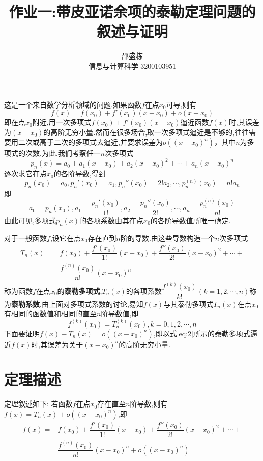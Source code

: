 \documentclass{ctexart}
\title{作业一:带皮亚诺余项的泰勒定理问题的叙述与证明}
\author{邵盛栋 \\ 信息与计算科学 3200103951}
\begin{document}
\maketitle


这是一个来自数学分析领域的问题,如果函数$ f $在点$ x_{0} $可导,则有
\[f(x)=f(x_{0})+f'(x_{0})(x-x_{0})+o(x-x_{0})\]
即在点$ x_{0} $附近,用一次多项式$ f(x_{0})+f'(x_{0})(x-x_{0}) $逼近函数$ f(x) $时,其误差为$ (x-x_{0}) $的高阶无穷小量.然而在很多场合,取一次多项式逼近是不够的,往往需要用二次或高于二次的多项式去逼近,并要求误差为$ o((x-x_{0})^{n}) $，其中$ n $为多项式的次数.为此,我们考察任一$ n $次多项式
\begin{equation}
	p_{n}(x)=a_{0}+a_{1}(x-x_{0})+a_{2}(x-x_{0})^{2}+\cdots+a_{n}(x-x_{0})^{n}
	\label{eq:1}
\end{equation}
逐次求它在点$ x_{0} $的各阶导数,得到
\[p_{n}(x_{0})=a_{0},p_{n}'(x_{0})=a_{1},p_{n}''(x_{0})=2!a_{2},\cdots,p_{n}^{(n)}(x_{0})=n!a_{n}\]
即
\[a_{0}=p_{n}(x_{0}),a_{1}=\dfrac{p_{n}'(x_{0})}{1!},a_{2}=\dfrac{p_{n}''(x_{0})}{2!},\cdots,a_{n}=\dfrac{p_{n}^{(n)}(x_{0})}{n!}\]
由此可见,多项式$ p_{n}(x) $的各项系数由其在点$ x_{0} $的各阶导数值所唯一确定.

对于一般函数$ f $,设它在点$ x_{0} $存在直到$ n $阶的导数.由这些导数构造一个$ n $次多项式
\begin{equation}
	\begin{split}
		T_{n}(x)=&f(x_{0})+\dfrac{f'(x_{0})}{1!}(x-x_{0})+\dfrac{f''(x_{0})}{2!}(x-x_{0})^{2}+\cdots+\\
		&\dfrac{f^{(n)}(x_{0})}{n!}(x-x_{0})^{n}
		\label{eq:2}
	\end{split}
\end{equation}
称为函数$ f $在点$ x_{0} $的\textbf{泰勒多项式},$ T_{n}(x) $的各项系数$ \dfrac{f^{(k)}(x_{0})}{k!}(k=1,2,\cdots,n) $称为\textbf{泰勒系数}.由上面对多项式系数的讨论,易知$ f(x) $与其泰勒多项式$ T_{n}(x) $在点$ x_{0} $有相同的函数值和相同的直至$ n $阶导数值,即
\begin{equation}
	f^{(k)}(x_{0})=T_{n}^{(k)}(x_{0}),k=0,1,2,\cdots,n
	\label{eq:3}
\end{equation}
下面要证明$ f(x)-T_{n}(x)=o((x-x_{0})^{n}) $,即以式\ref{eq:2}所示的泰勒多项式逼近$ f(x) $时,其误差为关于$ (x-x_{0})^{n} $的高阶无穷小量.
\section{定理描述}
定理叙述如下: 若函数$ f $在点$ x_{0} $存在直至$ n $阶导数,则有$ f(x)=T_{n}(x)+o((x-x_{0})^{n}) $,即
\begin{equation}
	\begin{split}
		f(x)=&f(x_{0})+\dfrac{f'(x_{0})}{1!}(x-x_{0})+\dfrac{f''(x_{0})}{2!}(x-x_{0})^{2}+\cdots+\\
		&\dfrac{f^{(n)}(x_{0})}{n!}(x-x_{0})^{n}+o((x-x_{0})^{n})
		\label{eq:4}
	\end{split}
\end{equation}
\end{document}
